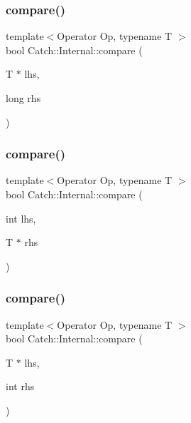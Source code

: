 \mbox{\label{namespace_catch_1_1_internal_a3f89c65fdb06aa7b648c5acf0ca107a9}} 
\subsubsection{compare()\hspace{0.1cm}{\footnotesize\ttfamily [15/17]}}
{\footnotesize\ttfamily template$<$Operator Op, typename T $>$ \\
bool Catch\+::\+Internal\+::compare (\begin{DoxyParamCaption}\item[{T $\ast$}]{lhs,  }\item[{long}]{rhs }\end{DoxyParamCaption})}

\mbox{\label{namespace_catch_1_1_internal_a4f30c29e4adb62c7e209e5b988e59397}} 
\subsubsection{compare()\hspace{0.1cm}{\footnotesize\ttfamily [16/17]}}
{\footnotesize\ttfamily template$<$Operator Op, typename T $>$ \\
bool Catch\+::\+Internal\+::compare (\begin{DoxyParamCaption}\item[{int}]{lhs,  }\item[{T $\ast$}]{rhs }\end{DoxyParamCaption})}

\mbox{\label{namespace_catch_1_1_internal_a95361ddae55c9a390e6510bdadccb1fc}} 
\subsubsection{compare()\hspace{0.1cm}{\footnotesize\ttfamily [17/17]}}
{\footnotesize\ttfamily template$<$Operator Op, typename T $>$ \\
bool Catch\+::\+Internal\+::compare (\begin{DoxyParamCaption}\item[{T $\ast$}]{lhs,  }\item[{int}]{rhs }\end{DoxyParamCaption})}

